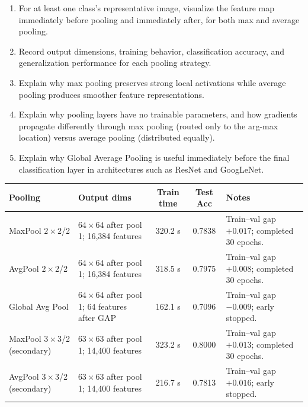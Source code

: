 \documentclass[12pt,a4paper]{article}
\begin{document}
\begin{stepbox}
\begin{enumerate}[leftmargin=*, label=\arabic*.]
  \item For at least one class's representative image, visualize the feature map
        immediately before pooling and immediately after, for both max and average
        pooling.
  \item Record output dimensions, training behavior, classification accuracy, and
        generalization performance for each pooling strategy.
  \item Explain why max pooling preserves strong local activations while average
        pooling produces smoother feature representations.
  \item Explain why pooling layers have no trainable parameters, and how gradients
        propagate differently through max pooling (routed only to the arg-max
        location) versus average pooling (distributed equally).
  \item Explain why Global Average Pooling is useful immediately before the final
        classification layer in architectures such as ResNet and GoogLeNet.
\end{enumerate}
\end{stepbox}

\begin{center}
\renewcommand{\arraystretch}{1.3}
\begin{tabular}{|p{3cm}|p{3.3cm}|c|c|p{3.6cm}|}
\hline
\textbf{Pooling} & \textbf{Output dims} & \textbf{Train time} & \textbf{Test Acc} & \textbf{Notes} \\
\hline
MaxPool $2\times2$/2 & $64\times64$ after pool 1; 16,384 features & 320.2 s & 0.7838 & Train--val gap $+0.017$; completed 30 epochs. \\
\hline
AvgPool $2\times2$/2 & $64\times64$ after pool 1; 16,384 features & 318.5 s & 0.7975 & Train--val gap $+0.008$; completed 30 epochs. \\
\hline
Global Avg Pool & $64\times64$ after pool 1; 64 features after GAP & 162.1 s & 0.7096 & Train--val gap $-0.009$; early stopped. \\
\hline
MaxPool $3\times3$/2 (secondary) & $63\times63$ after pool 1; 14,400 features & 323.2 s & 0.8000 & Train--val gap $+0.013$; completed 30 epochs. \\
\hline
AvgPool $3\times3$/2 (secondary) & $63\times63$ after pool 1; 14,400 features & 216.7 s & 0.7813 & Train--val gap $+0.016$; early stopped. \\
\hline
\end{tabular}
\end{center}
\end{document}

